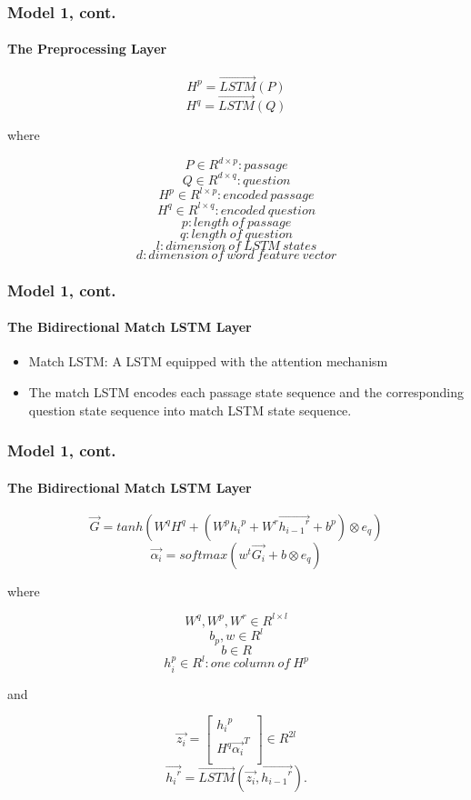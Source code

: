 \documentclass{beamer}
\begin{document}
\begin{frame} \frametitle{Model 1, cont.}\framesubtitle{The Preprocessing Layer}
    $$H^p = \overrightarrow{LSTM}(P)$$
    $$H^q = \overrightarrow{LSTM}(Q)$$

    where

    $$P\in R^{d \times p}: passage$$
    $$Q\in R^{d \times q}: question$$
    $$H^p\in R^{l \times p}: encoded\ passage$$
    $$H^q\in R^{l \times q}: encoded\ question$$
    $$p: length \ of\ passage$$
    $$q: length\ of\ question$$
    $$l: dimension\ of\ LSTM\ states$$
    $$d: dimension\ of\ word\ feature\ vector$$

\end{frame}

\begin{frame} \frametitle{Model 1, cont.}\framesubtitle{The Bidirectional Match LSTM Layer}
    \begin{itemize}
        \item Match LSTM: A LSTM equipped with the attention mechanism
        \item The match LSTM encodes each passage state sequence and the corresponding question state sequence into match LSTM state sequence.
    \end{itemize}
\end{frame}

\begin{frame} \frametitle{Model 1, cont.}\framesubtitle{The Bidirectional Match LSTM Layer}

    $$\overrightarrow{G} = tanh(W^qH^q + (W^p{h_i}^p + W^r\overrightarrow{{h_{i-1}}^r} + b^p) \otimes e_q)$$
    $$\overrightarrow{\alpha _i} = softmax(w^t\overrightarrow{G_i} + b \otimes e_q)$$


    where

    $$W^q, W^p, W^r\in R^{l \times l} $$
    $$b_p, w\in R^{l}  $$
    $$b \in R $$
    $${h_{i}^p}\in R^{l}: one\ column\ of\ H^p  $$

    and

    \[ \overrightarrow{z_i} =
    \begin{bmatrix}
    {h_i}^p \\
    H^q\overrightarrow{ {\alpha _i}}^T \\
    \end{bmatrix}
    \in R^{2l}
    \]
    $$\overrightarrow{{h_i}^r} = \overrightarrow{LSTM}(\overrightarrow{z_i}, \overrightarrow{{h_{i-1}}^r}).$$

\end{frame}
\end{document}
